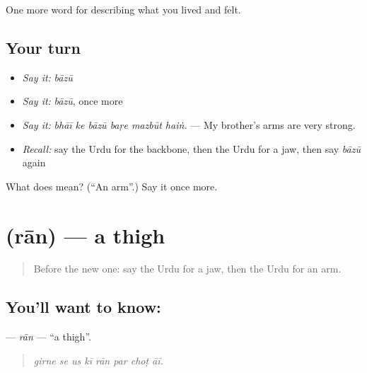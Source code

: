 \begin{grammarlens}[title={What you've built}]
One more word for describing what you lived and felt.
\end{grammarlens}

\subsection*{Your turn}
\begin{itemize}
\raggedright
  \item \emph{Say it:} \emph{bāzū}
  \item \emph{Say it:} \emph{bāzū}, once more
  \item \emph{Say it:} \emph{bhāī ke bāzū baṛe mazbūt haiṅ.} — My brother's arms are very strong.
  \item \emph{Recall:} say the Urdu for the backbone, then the Urdu for a jaw, then say \emph{bāzū} again
\end{itemize}

\begin{tcolorbox}[breakable,colback=teal!4,colframe=teal!35!black,title={Before you move on}]
What does  mean? (\textquotedblleft{}An arm\textquotedblright{}.) Say it once more.
\end{tcolorbox}
\section[\texorpdfstring{\ur{ران} (rān)}{ران (rān)}]{ (rān) — a thigh}

\label{lesson:UR-C466-ran}



\begin{quote}
Before the new one: say the Urdu for a jaw, then the Urdu for an arm.
\end{quote}

\subsection*{You'll want to know: }
\textbf{} — \emph{rān} — \textquotedblleft{}a thigh\textquotedblright{}.

\begin{quote}
       
\end{quote}

\begin{quote}
\emph{girne se us kī rān par choṭ āī.}
\end{quote}

